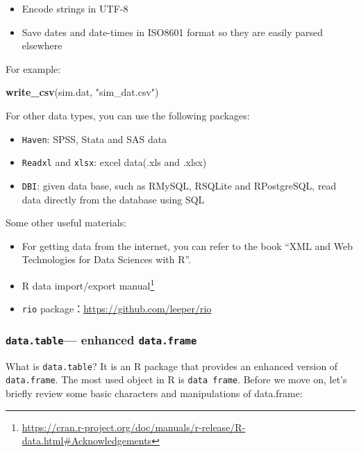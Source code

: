 \documentclass[12pt,]{krantz}
\makeatletter
\newenvironment{Shaded}{\begin{snugshade}}{\end{snugshade}}
\newcommand{\KeywordTok}[1]{\textcolor[rgb]{0.27,0.27,0.27}{\textbf{#1}}}
\newcommand{\StringTok}[1]{\textcolor[rgb]{0.5,0.5,0.5}{#1}}
\newcommand{\NormalTok}[1]{#1}
\providecommand{\tightlist}{%
  \setlength{\itemsep}{0pt}\setlength{\parskip}{0pt}}
\renewcommand{\href}[2]{#2\footnote{\url{#1}}}
\newenvironment{kframe}{%
\medskip{}
\setlength{\fboxsep}{.8em}
 \def\at@end@of@kframe{}%
 \ifinner\ifhmode%
  \def\at@end@of@kframe{\end{minipage}}%
  \begin{minipage}{\columnwidth}%
 \fi\fi%
 \def\FrameCommand##1{\hskip\@totalleftmargin \hskip-\fboxsep
 \colorbox{shadecolor}{##1}\hskip-\fboxsep
     \hskip-\linewidth \hskip-\@totalleftmargin \hskip\columnwidth}%
 \MakeFramed {\advance\hsize-\width
   \@totalleftmargin\z@ \linewidth\hsize
   \@setminipage}}%
 {\par\unskip\endMakeFramed%
 \at@end@of@kframe}
\renewenvironment{Shaded}{\begin{kframe}}{\end{kframe}}
\theoremstyle{definition}
\theoremstyle{definition}
\theoremstyle{definition}
\theoremstyle{remark}
\makeatother
\begin{document}
\begin{itemize}
\tightlist
\item
  Encode strings in UTF-8
\item
  Save dates and date-times in ISO8601 format so they are easily parsed
  elsewhere
\end{itemize}

For example:

\begin{Shaded}
\begin{Highlighting}[]
\KeywordTok{write_csv}\NormalTok{(sim.dat, }\StringTok{"sim_dat.csv"}\NormalTok{)}
\end{Highlighting}
\end{Shaded}

For other data types, you can use the following packages:

\begin{itemize}
\tightlist
\item
  \texttt{Haven}: SPSS, Stata and SAS data
\item
  \texttt{Readxl} and \texttt{xlsx}: excel data(.xls and .xlsx)
\item
  \texttt{DBI}: given data base, such as RMySQL, RSQLite and
  RPostgreSQL, read data directly from the database using SQL
\end{itemize}

Some other useful materials:

\begin{itemize}
\tightlist
\item
  For getting data from the internet, you can refer to the book ``XML
  and Web Technologies for Data Sciences with R''.\\
\item
  \href{https://cran.r-project.org/doc/manuals/r-release/R-data.html\#Acknowledgements}{R
  data import/export manual}
\item
  \texttt{rio} package：\url{https://github.com/leeper/rio}
\end{itemize}

\subsubsection{\texorpdfstring{\texttt{data.table}--- enhanced
\texttt{data.frame}}{data.table--- enhanced data.frame}}\label{data.table-enhanced-data.frame}

What is \texttt{data.table}? It is an R package that provides an
enhanced version of \texttt{data.frame}. The most used object in R is
\texttt{data\ frame}. Before we move on, let's briefly review some basic
characters and manipulations of data.frame:
\end{document}
